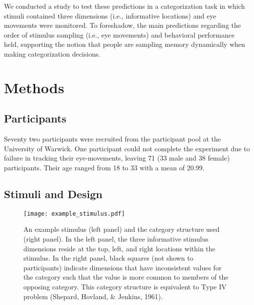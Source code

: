 \documentclass[man,floatsintext]{apa6}
\begin{document}
We conducted a study to test these predictions in a categorization task in which stimuli contained
three dimensions (i.e., informative locations) and eye movements were monitored. To foreshadow, the
main predictions regarding the order of stimulus sampling (i.e., eye movements) and behavioral
performance held, supporting the notion that people are sampling memory dynamically when making
categorization decisions.


\section{Methods}
\subsection{Participants}

Seventy two participants were recruited from the participant pool at the University of Warwick. One
participant could not complete the experiment due to failure in tracking their eye-movements,
leaving 71 (33 male and 38 female) participants. Their age ranged from 18 to 33 with a mean of
20.99.

\subsection{Stimuli and Design}

\begin{figure}[t]
    \centering
    \texttt{[image: example\_stimulus.pdf]}

    \caption{An example stimulus (left panel) and the category structure used (right panel). In the
    left panel, the three informative stimulus dimensions reside at the top, left, and  right
    locations within the stimulus.  In the right panel, black squares (not shown to participants)
    indicate dimensions that have inconsistent values for the category such that the value is more
    common to members of the opposing category. This category structure is equivalent to Type IV
    problem (Shepard, Hovland, \& Jenkins, 1961). }

\label{fig:stimulus}
\end{figure}
\end{document}
